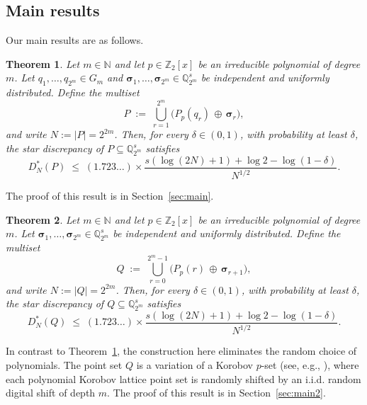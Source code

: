 \documentclass[12pt]{article}
\newtheorem{theorem}{Theorem}[section]
\theoremstyle{definition}
\numberwithin{equation}{section}
\begin{document}
\subsection{Main results}\label{sec_main_results}

Our main results are as follows.

\begin{theorem}\label{thm1}
Let $m\in\mathbb{N}$ and let $p\in\mathbb{Z}_2[x]$ be an irreducible polynomial of degree $m$. 
Let $q_1,\dots,q_{2^m}\in G_m$ and $\boldsymbol{\sigma}_1,\dots,\boldsymbol{\sigma}_{2^m}\in \mathbb{Q}_{2^m}^s$ be independent and uniformly distributed. Define the multiset
\begin{equation}\label{defP}
  P \;:=\; \bigcup_{r=1}^{2^m} \bigl( P_p(q_r)\,\oplus\,\boldsymbol{\sigma}_r \bigr),
\end{equation}
and write $N:=|P|=2^{2m}$. Then, for every $\delta\in(0,1)$, with probability at least $\delta$, the star discrepancy of $P\subseteq \mathbb{Q}_{2^m}^s$ satisfies
\[
  D_N^\ast(P)\;\le\; (1.723\ldots) \times  \frac{s (\log(2 N) +1)+ \log 2 - \log(1-\delta)}{N^{1/2}}.
\]
\end{theorem}

The proof of this result is in Section~\ref{sec:main}.


\begin{theorem}\label{thm2}
Let $m\in\mathbb{N}$ and let $p\in\mathbb{Z}_2[x]$ be an irreducible polynomial of degree $m$. 
Let  $\boldsymbol{\sigma}_1,\dots,\boldsymbol{\sigma}_{2^m}\in \mathbb{Q}_{2^m}^s$ be independent and uniformly distributed. Define the multiset
\begin{equation}\label{defP2}
  Q \;:=\; \bigcup_{r=0}^{2^m-1} \bigl( P_p(r)\,\oplus\,\boldsymbol{\sigma}_{r+1} \bigr),
\end{equation}
and write $N:=|Q|=2^{2m}$. Then, for every $\delta\in(0,1)$, with probability at least $\delta$, the star discrepancy of $Q\subseteq \mathbb{Q}_{2^m}^s$ satisfies
\[
  D_N^\ast(Q)\;\le\; (1.723\ldots) \times  \frac{s (\log(2 N) +1)+ \log 2 - \log(1-\delta)}{N^{1/2}}.
\]
\end{theorem}

In contrast to Theorem~\ref{thm1}, the construction here eliminates the random choice of polynomials. The point set $Q$ is a variation of a Korobov $p$-set (see, e.g., \cite[Chapter~6]{DKP22}), where each polynomial Korobov lattice point set is randomly shifted by an i.i.d. random digital shift of depth $m$. The proof of this result is in Section~\ref{sec:main2}.
\end{document}

